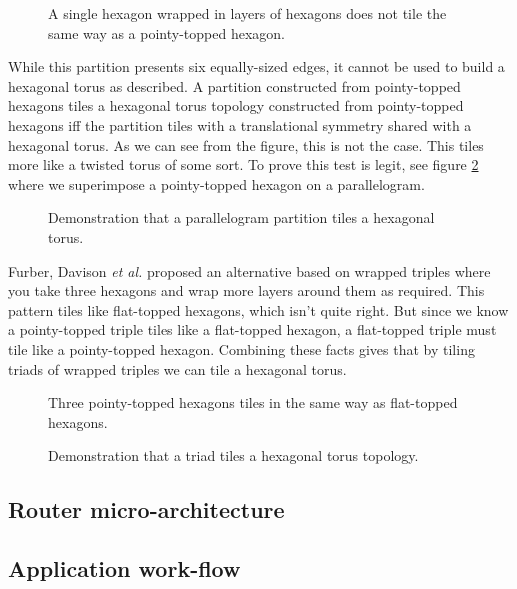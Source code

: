 			\begin{figure}
				\center
				
				\caption{A single hexagon wrapped in layers of hexagons does not tile the
				same way as a pointy-topped hexagon.}
				\label{fig:wrapped-hexagon-tiling}
			\end{figure}
			
			While this partition presents six equally-sized edges, it cannot be used
			to build a hexagonal torus as described. A partition constructed from
			pointy-topped hexagons tiles a hexagonal torus topology constructed from
			pointy-topped hexagons iff the partition tiles with a translational
			symmetry shared with a hexagonal torus. As we can see from the figure,
			this is not the case. This tiles more like a twisted torus of some sort.
			To prove this test is legit, see figure \ref{fig:parallelogram-tiling}
			where we superimpose a pointy-topped hexagon on a parallelogram.
			
			\begin{figure}
				\center
				
				\caption{Demonstration that a parallelogram partition tiles a hexagonal
				torus.}
				\label{fig:parallelogram-tiling}
			\end{figure}
			
			Furber, Davison \emph{et al.} \cite{davidsonWiring} proposed an
			alternative based on wrapped triples where you take three hexagons and
			wrap more layers around them as required. This pattern tiles like
			flat-topped hexagons, which isn't quite right. But since we know a
			pointy-topped triple tiles like a flat-topped hexagon, a flat-topped
			triple must tile like a pointy-topped hexagon. Combining these facts
			gives that by tiling triads of wrapped triples we can tile a hexagonal
			torus.
			
			\begin{figure}
				\center
				
				\caption{Three pointy-topped hexagons tiles in the same way as flat-topped
				hexagons.}
				\label{fig:wrapped-triple-tiling}
			\end{figure}
			
			\begin{figure}
				\center
				
				\caption{Demonstration that a triad tiles a hexagonal torus topology.}
				\label{fig:triad-tiling}
			\end{figure}
		
		\subsection{Router micro-architecture}
		\subsection{Application work-flow}
